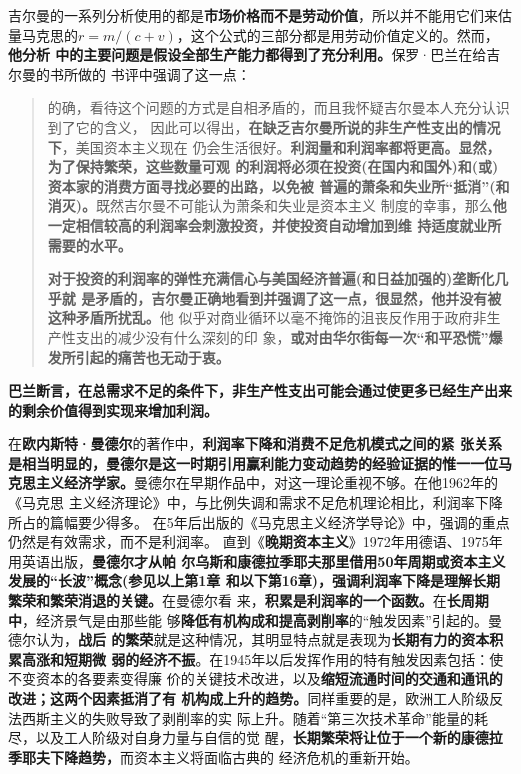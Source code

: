 吉尔曼的一系列分析使用的都是\textbf{市场价格而不是劳动价值}，所以并不能用它们来估
量马克思的$r=m/(c+v)$，这个公式的三部分都是用劳动价值定义的。然而，\textbf{他分析
  中的主要问题是假设全部生产能力都得到了充分利用。}保罗·巴兰在给吉尔曼的书所做的
书评中强调了这一点：
\begin{quotation}
  的确，看待这个问题的方式是自相矛盾的，而且我怀疑吉尔曼本人充分认识到了它的含义，
  因此可以得出，\textbf{在缺乏吉尔曼所说的非生产性支出的情况下}，美国资本主义现在
  仍会生活很好。\textbf{利润量和利润率都将更高。显然，为了保持繁荣，这些数量可观
    的利润将必须在投资(在国内和国外)和(或)资本家的消费方面寻找必要的出路，以免被
    普遍的萧条和失业所“抵消”(和消灭)。}既然吉尔曼不可能认为萧条和失业是资本主义
  制度的幸事，那么\textbf{他一定相信较高的利润率会刺激投资，并使投资自动增加到维
    持适度就业所需要的水平。}

  \textbf{对于投资的利润率的弹性充满信心与美国经济普遍(和日益加强的)垄断化几乎就
    是矛盾的，吉尔曼正确地看到并强调了这一点，很显然，他并没有被这种矛盾所扰乱。}他
  似乎对商业循环以毫不掩饰的沮丧反作用于政府非生产性支出的减少没有什么深刻的印
  象，\textbf{或对由华尔街每一次“和平恐慌”爆发所引起的痛苦也无动于衷。}
\end{quotation}

\textbf{巴兰断言，在总需求不足的条件下，非生产性支出可能会通过使更多已经生产出来
  的剩余价值得到实现来增加利润。}

在\textbf{欧内斯特·曼德尔}的著作中，\textbf{利润率下降和消费不足危机模式之间的紧
  张关系是相当明显的，曼德尔是这一时期引用赢利能力变动趋势的经验证据的惟一一位马
  克思主义经济学家。}曼德尔在早期作品中，对这一理论重视不够。在他1962年的《马克思
主义经济理论》中，与比例失调和需求不足危机理论相比，利润率下降所占的篇幅要少得多。
在5年后出版的《马克思主义经济学导论》中，强调的重点仍然是有效需求，而不是利润率。
直到《\textbf{晚期资本主义}》1972年用德语、1975年用英语出版，\textbf{曼德尔才从帕
  尔乌斯和康德拉季耶夫那里借用50年周期或资本主义发展的“长波”概念(参见以上第1章
  和以下第16章)，强调利润率下降是理解长期繁荣和繁荣消退的关键。}在曼德尔看
来，\textbf{积累是利润率的一个函数。}在\textbf{长周期中}，经济景气是由那些能
够\textbf{降低有机构成和提高剥削率}的“触发因素”引起的。曼德尔认为，\textbf{战后
  的繁荣}就是这种情况，其明显特点就是表现为\textbf{长期有力的资本积累高涨和短期微
  弱的经济不振}。在1945年以后发挥作用的特有触发因素包括：使不变资本的各要素变得廉
价的关键技术改进，以及\textbf{缩短流通时间的交通和通讯的改进；这两个因素抵消了有
  机构成上升的趋势。}同样重要的是，欧洲工人阶级反法西斯主义的失败导致了剥削率的实
际上升。随着“第三次技术革命”能量的耗尽，以及工人阶级对自身力量与自信的觉
醒，\textbf{长期繁荣将让位于一个新的康德拉季耶夫下降趋势，}而资本主义将面临古典的
经济危机的重新开始。

